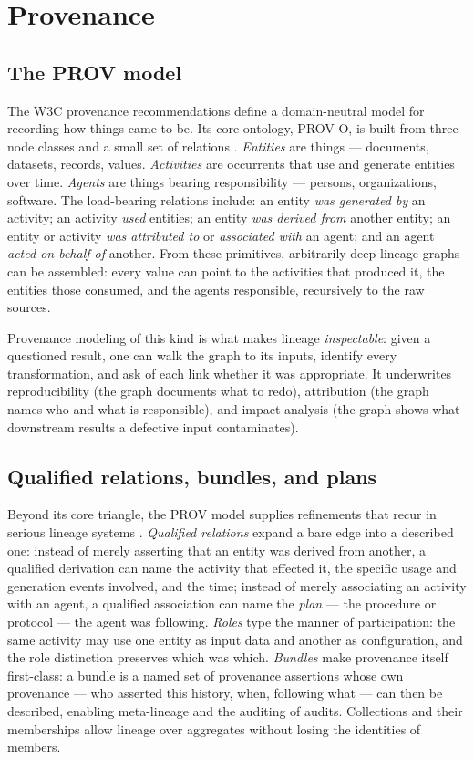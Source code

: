 \section{Provenance}\label{ch02:prov}

\subsection{The PROV model}\label{ch02:prov:model}

The W3C provenance recommendations define a domain-neutral model for recording how things came to be. Its core ontology, PROV-O, is built from three node classes and a small set of relations \cite{prov}. \emph{Entities} are things --- documents, datasets, records, values. \emph{Activities} are occurrents that use and generate entities over time. \emph{Agents} are things bearing responsibility --- persons, organizations, software. The load-bearing relations include: an entity \emph{was generated by} an activity; an activity \emph{used} entities; an entity \emph{was derived from} another entity; an entity or activity \emph{was attributed to} or \emph{associated with} an agent; and an agent \emph{acted on behalf of} another. From these primitives, arbitrarily deep lineage graphs can be assembled: every value can point to the activities that produced it, the entities those consumed, and the agents responsible, recursively to the raw sources.

Provenance modeling of this kind is what makes lineage \emph{inspectable}: given a questioned result, one can walk the graph to its inputs, identify every transformation, and ask of each link whether it was appropriate. It underwrites reproducibility (the graph documents what to redo), attribution (the graph names who and what is responsible), and impact analysis (the graph shows what downstream results a defective input contaminates).

\subsection{Qualified relations, bundles, and plans}\label{ch02:prov:qualified}

Beyond its core triangle, the PROV model supplies refinements that recur in serious lineage systems \cite{prov}. \emph{Qualified relations} expand a bare edge into a described one: instead of merely asserting that an entity was derived from another, a qualified derivation can name the activity that effected it, the specific usage and generation events involved, and the time; instead of merely associating an activity with an agent, a qualified association can name the \emph{plan} --- the procedure or protocol --- the agent was following. \emph{Roles} type the manner of participation: the same activity may use one entity as input data and another as configuration, and the role distinction preserves which was which. \emph{Bundles} make provenance itself first-class: a bundle is a named set of provenance assertions whose own provenance --- who asserted this history, when, following what --- can then be described, enabling meta-lineage and the auditing of audits. Collections and their memberships allow lineage over aggregates without losing the identities of members.

